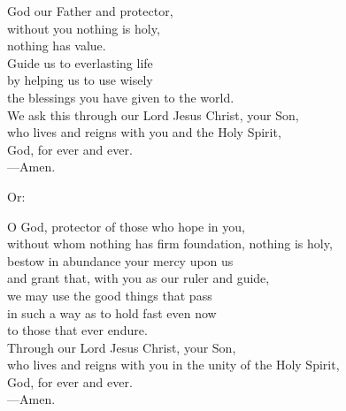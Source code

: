 \prayer


\begin{prayerverse}
God our Father and protector,\\
without you nothing is holy,\\
nothing has value.\\
Guide us to everlasting life\\
by helping us to use wisely\\
the blessings you have given to the world.\\
We ask this through our Lord Jesus Christ, your Son,\\
who lives and reigns with you and the Holy Spirit,\\
God, for ever and ever.\\
{\color{red}---\thinspace}Amen.
\end{prayerverse}

Or:

\begin{prayerverse}
O God, protector of those who hope in you,\\
without whom nothing has firm foundation, nothing is holy,\\
bestow in abundance your mercy upon us\\
and grant that, with you as our ruler and guide,\\
we may use the good things that pass\\
in such a way as to hold fast even now\\
to those that ever endure.\\
Through our Lord Jesus Christ, your Son,\\
who lives and reigns with you in the unity of the Holy Spirit,\\
God, for ever and ever.\\
{\color{red}---\thinspace}Amen.
\end{prayerverse}

